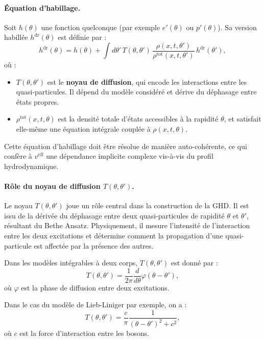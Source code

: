 \paragraph{Équation d’habillage.}
Soit $h(\theta)$ une fonction quelconque (par exemple $e'(\theta)$ ou $p'(\theta)$). Sa version habillée $h^{\mathrm{dr}}(\theta)$ est définie par :
\[
h^{\mathrm{dr}}(\theta) = h(\theta) + \int d\theta' \, T(\theta,\theta')\, \frac{\rho(x,t,\theta')}{\rho^{\mathrm{tot}}(x,t,\theta')} \, h^{\mathrm{dr}}(\theta'),
\]
où :
\begin{itemize}
    \item $T(\theta,\theta')$ est le \textbf{noyau de diffusion}, qui encode les interactions entre les quasi-particules. Il dépend du modèle considéré et dérive du déphasage entre états propres.
    \item $\rho^{\mathrm{tot}}(x,t,\theta)$ est la densité totale d’états accessibles à la rapidité $\theta$, et satisfait elle-même une équation intégrale couplée à $\rho(x,t,\theta)$.
\end{itemize}

Cette équation d’habillage doit être résolue de manière auto-cohérente, ce qui confère à $v^{\mathrm{eff}}$ une dépendance implicite complexe vis-à-vis du profil hydrodynamique.

\paragraph{Rôle du noyau de diffusion $T(\theta,\theta')$.}
Le noyau $T(\theta,\theta')$ joue un rôle central dans la construction de la GHD. Il est issu de la dérivée du déphasage entre deux quasi-particules de rapidité $\theta$ et $\theta'$, résultant du Bethe Ansatz. Physiquement, il mesure l’intensité de l’interaction entre les deux excitations et détermine comment la propagation d’une quasi-particule est affectée par la présence des autres.

Dans les modèles intégrables à deux corps, $T(\theta,\theta')$ est donné par :
\[
T(\theta,\theta') = \frac{1}{2\pi} \frac{d}{d\theta} \varphi(\theta - \theta'),
\]
où $\varphi$ est la phase de diffusion entre deux excitations.

Dans le cas du modèle de Lieb-Liniger par exemple, on a :
\[
T(\theta,\theta') = \frac{c}{\pi} \frac{1}{(\theta - \theta')^2 + c^2},
\]
où $c$ est la force d’interaction entre les bosons.

